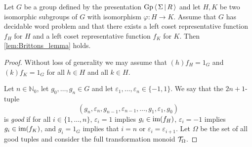 \begin{lemma}\label{lem:Brittons_lemma_nonconstructive}
  Let $G$ be a group defined by the presentation $\textrm{Gp}\left\langle\, \Sigma \,\middle|\, R \,\right\rangle$ and let $H, K$ be two
  isomorphic subgroups of $G$ with isomorphism
  $\varphi: H\rightarrow K$. Assume that $G$ has decidable word problem and that
  there exists a left coset representative function
  $f_H$ for $H$ and a left coset representative function $f_K$ for $K$.
  Then \cref{lem:Brittons_lemma} holds.
\end{lemma}
\begin{proof}
  Without loss of generality we may assume that $(h)f_H = 1_G$
  and $(k)f_K = 1_G$ for all $h\in H$ and all $k\in H$.

  Let $n\in \mathbb{N}_0$, let $g_0,\ldots, g_n\in G$ and let $\varepsilon_1,\ldots,
  \varepsilon_n\in\{-1, 1\}$. We say that the $2n+1$-tuple
  \[
    \left(g_n, \varepsilon_n, g_{n-1}, \varepsilon_{n-1}, \ldots, g_1, \varepsilon_1, g_0\right)
  \]
  is \emph{good} if for all $i\in\{1, \ldots, n\}$,
  $\varepsilon_i = 1$ implies $g_i \in \textrm{im}(f_H)$,
  $\varepsilon_i = -1$ implies $g_i \in \textrm{im}(f_K)$, and
  $g_i = 1_G$ implies that $i = n$ or $\varepsilon_i = \varepsilon_{i+1}$.
  Let $\Omega$ be the set of all good tuples and consider the full transformation monoid
  $\mathcal{T}_\Omega$.


\end{proof}
